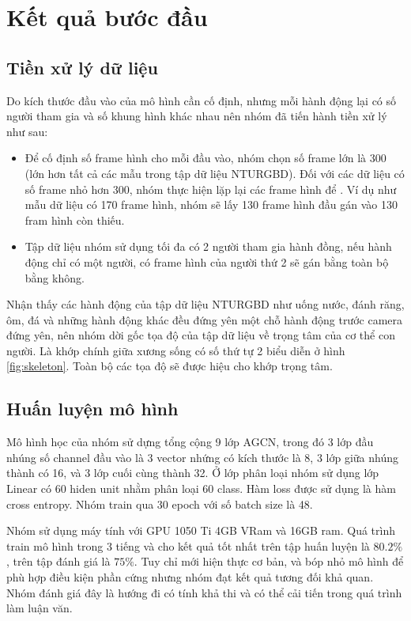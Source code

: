 \section{Kết quả bước đầu}
\label{section:result}

\subsection{Tiền xử lý dữ liệu}

Do kích thước đầu vào của mô hình cần cố định, nhưng mỗi hành động lại có số người tham gia và số khung hình khác nhau nên nhóm đã tiến hành tiền xử lý như sau:

\begin{itemize}
    \item Để cố định số frame hình cho mỗi đầu vào, nhóm chọn số frame lớn là 300 (lớn hơn tất cả các mẫu trong tập dữ liệu NTURGBD). Đối với các dữ liệu có số frame nhỏ hơn 300, nhóm thực hiện lặp lại các frame hình để . Ví dụ như mẫu dữ liệu có 170 frame hình, nhóm sẽ lấy 130 frame hình đầu gán vào 130 fram hình còn thiếu.
    \item Tập dữ liệu nhóm sử dụng tối đa có 2 người tham gia hành đồng, nếu hành động chỉ có một người, có frame hình của người thứ 2 sẽ gán bằng toàn bộ bằng không.
\end{itemize}

Nhận thấy các hành động của tập dữ liệu NTURGBD như uống nước, đánh răng, ôm, đá và những hành động khác đều đứng yên một chỗ hành động trước camera đứng yên, nên nhóm dời gốc tọa độ của tập dữ liệu về trọng tâm của cơ thể con người. Là khớp chính giữa xương sống có số thứ tự 2 biểu diễn ở hình \ref{fig:skeleton}. Toàn bộ các tọa độ sẽ được hiệu cho khớp trọng tâm.

\subsection{Huấn luyện mô hình}

Mô hình học của nhóm sử dựng tổng cộng 9 lớp AGCN, trong đó 3 lớp đầu nhúng số channel đầu vào là 3 vector nhứng có kích thước là 8, 3 lớp giữa nhúng thành có 16, và 3 lớp cuối cùng thành 32. Ở lớp phân loại nhóm sử dụng lớp Linear có 60 hiden unit nhằm phân loại 60 class. Hàm loss được sử dụng là hàm cross entropy. Nhóm train qua 30 epoch với số batch size là 48.

Nhóm sử dụng máy tính với GPU 1050 Ti 4GB VRam và 16GB ram. Quá trình train mô hình trong 3 tiếng và cho kết quả tốt nhất trên tập huấn luyện là $80.2\%$, trên tập đánh giá là $75\%$. Tuy chỉ mới hiện thực cơ bản, và bóp nhỏ mô hình để phù hợp điều kiện phần cứng nhưng nhóm đạt kết quả tương đối khả quan. Nhóm đánh giá đây là hướng đi có tính khả thi và có thể cải tiến trong quá trình làm luận văn.

